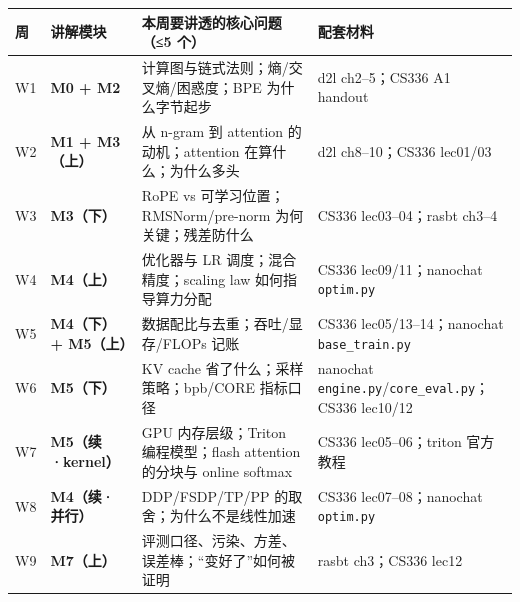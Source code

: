\documentclass[
  chinese,
  11pt,
]{ctexart}
\newcounter{none} %
\begin{document}
{\def\LTcaptype{none} %
\begin{longtable}[]{@{}
  >{\raggedright\arraybackslash}p{}
  >{\raggedright\arraybackslash}p{}
  >{\raggedright\arraybackslash}p{}
  >{\raggedright\arraybackslash}p{}@{}}
\toprule\noalign{}
\begin{minipage}[b]{\linewidth}\raggedright
周
\end{minipage} & \begin{minipage}[b]{\linewidth}\raggedright
讲解模块
\end{minipage} & \begin{minipage}[b]{\linewidth}\raggedright
本周要讲透的核心问题（≤5 个）
\end{minipage} & \begin{minipage}[b]{\linewidth}\raggedright
配套材料
\end{minipage} \\
\midrule\noalign{}
\endhead
\bottomrule\noalign{}
\endlastfoot
W1 & \textbf{M0 + M2} & 计算图与链式法则；熵/交叉熵/困惑度；BPE 为什么字节起步 & d2l ch2--5；CS336 A1 handout \\
W2 & \textbf{M1 + M3（上）} & 从 n-gram 到 attention 的动机；attention 在算什么；为什么多头 & d2l ch8--10；CS336 lec01/03 \\
W3 & \textbf{M3（下）} & RoPE vs 可学习位置；RMSNorm/pre-norm 为何关键；残差防什么 & CS336 lec03--04；rasbt ch3--4 \\
W4 & \textbf{M4（上）} & 优化器与 LR 调度；混合精度；scaling law 如何指导算力分配 & CS336 lec09/11；nanochat \texttt{optim.py} \\
W5 & \textbf{M4（下）+ M5（上）} & 数据配比与去重；吞吐/显存/FLOPs 记账 & CS336 lec05/13--14；nanochat \texttt{base\_train.py} \\
W6 & \textbf{M5（下）} & KV cache 省了什么；采样策略；bpb/CORE 指标口径 & nanochat \texttt{engine.py}/\texttt{core\_eval.py}；CS336 lec10/12 \\
W7 & \textbf{M5（续·kernel）} & GPU 内存层级；Triton 编程模型；flash attention 的分块与 online softmax & CS336 lec05--06；triton 官方教程 \\
W8 & \textbf{M4（续·并行）} & DDP/FSDP/TP/PP 的取舍；为什么不是线性加速 & CS336 lec07--08；nanochat \texttt{optim.py} \\
W9 & \textbf{M7（上）} & 评测口径、污染、方差、误差棒；``变好了''如何被证明 & rasbt ch3；CS336 lec12 \\

\end{longtable}}
\end{document}
